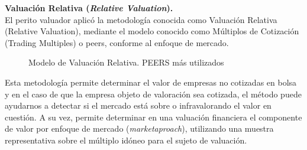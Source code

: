 \textcolor{secundario}{\textbf{Valuaci\'on Relativa (\textit{Relative Valuation}).}}\\[5pt]

El perito valuador aplic\'o la metodolog\'ia conocida como Valuaci\'on Relativa (Relative Valuation), mediante el modelo conocido como M\'ultiplos de Cotizaci\'on (Trading Multiples) o \gls{peers}, conforme al enfoque de mercado.\\




%
%
\begin{figure}[H]
\caption{Modelo de Valuaci\'on Relativa. PEERS m\'as utilizados\label{fig:peers1}}
       \hfill
\end{figure}

 Esta metodolog\'ia permite determinar el valor de empresas no cotizadas en bolsa y en el caso de que la empresa objeto de valoraci\'on sea cotizada, el m\'etodo puede ayudarnos a detectar si el mercado  est\'a sobre o infravalorando el valor en cuesti\'on.  A su vez, permite determinar en una valuaci\'on financiera el componente de valor por enfoque de mercado (\textit{\gls{marketaproach}}), utilizando una muestra representativa sobre el m\'ultiplo id\'oneo para el sujeto de valuaci\'on. \\
 